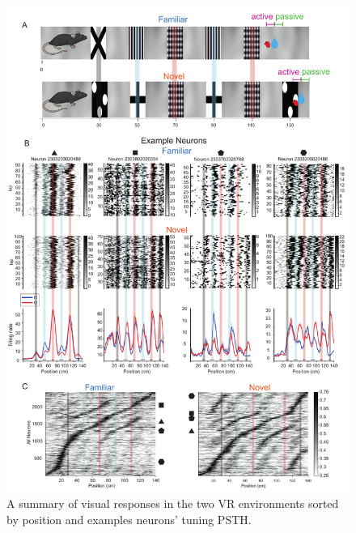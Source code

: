 \begin{figure}
    \centering
    \includegraphics[width=1\linewidth]{figures//Chapter 4 V1/fig1_VR_setup_and_responses.pdf}
    \caption{A summary of visual responses in the two VR environments sorted by position and examples neurons' tuning PSTH.}
    \label{fig:population map}
\end{figure}


